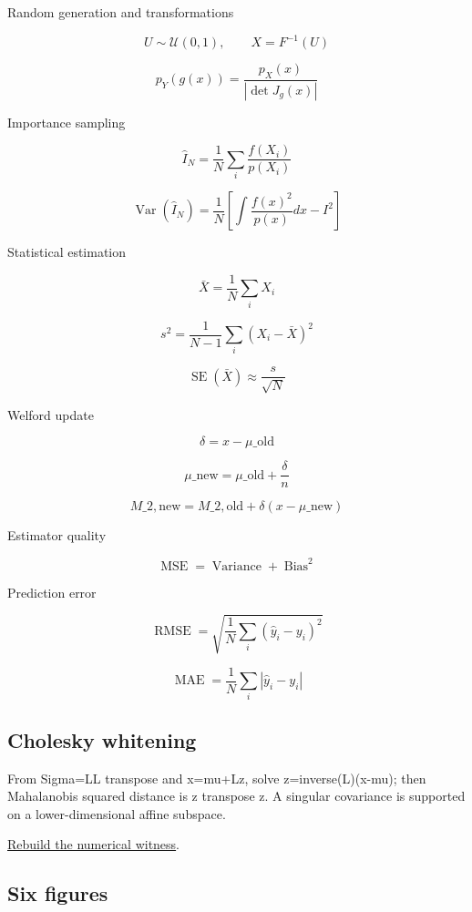 Random generation and transformations

\[
 U\sim\mathcal U(0,1),\qquad X=F^{-1}(U) 
\]

\[
 p_Y(g(x)) = \frac{p_X(x)}{|\det J_g(x)|} 
\]

Importance sampling

\[
 \widehat I_N= \frac1N\sum_i\frac{f(X_i)}{p(X_i)} 
\]

\[
 \operatorname{Var}(\widehat I_N) = \frac1N \left[ \int\frac{f(x)^2}{p(x)}dx-I^2 \right] 
\]

Statistical estimation

\[
 \bar X=\frac1N\sum_iX_i 
\]

\[
 s^2=\frac1{N-1}\sum_i(X_i-\bar X)^2 
\]

\[
 \operatorname{SE}(\bar X)\approx\frac{s}{\sqrt N} 
\]

Welford update

\[
 \delta=x-\mu\_{\mathrm{old}} 
\]

\[
 \mu\_{\mathrm{new}}= \mu\_{\mathrm{old}}+\frac{\delta}{n} 
\]

\[
 M\_{2,\mathrm{new}}= M\_{2,\mathrm{old}}+ \delta(x-\mu\_{\mathrm{new}}) 
\]

Estimator quality

\[
 \operatorname{MSE}= \operatorname{Variance}+ \operatorname{Bias}^2 
\]

Prediction error

\[
 \operatorname{RMSE}= \sqrt{\frac1N\sum_i(\hat y_i-y_i)^2} 
\]

\[
 \operatorname{MAE}= \frac1N\sum_i|\hat y_i-y_i| 
\]

\subsection{Cholesky whitening}\label{cholesky-whitening}

From Sigma=LL transpose and x=mu+Lz, solve z=inverse(L)(x-mu); then Mahalanobis squared distance is z transpose z. A singular covariance is supported on a lower-dimensional affine subspace.

\href{Continuous\%20Notes/Computing\%20Foundations\%20-\%20From\%20Bits\%20to\%20C++\%20and\%20Systems\%20APIs\#Original\%20bridge:\%20whiten\%20a\%20covariance\%20ellipse}{Rebuild the numerical witness}.

\subsection{Six figures}\label{six-figures}

